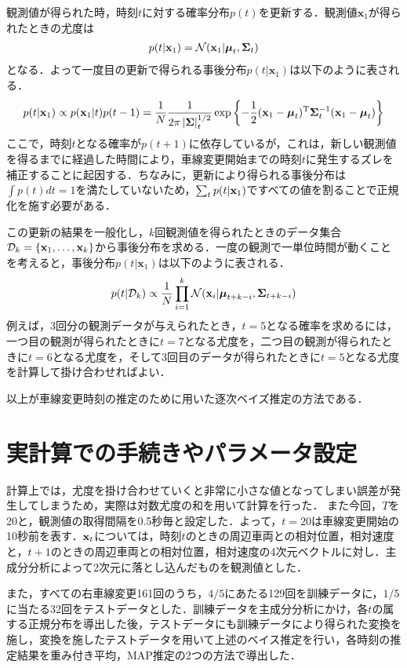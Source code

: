 観測値が得られた時，時刻$t$に対する確率分布$p(t)$を更新する．観測値$\mathbf{x}_1$が得られたときの尤度は
\begin{align}
	p(t|\mathbf{x}_1)=\mathcal{N}(\mathbf{x}_1|\boldsymbol{\mu}_t,\mathbf{\Sigma}_t)
\end{align}
となる．よって一度目の更新で得られる事後分布$p(t|\mathbf{x}_1)$は以下のように表される．
\begin{align}
	p(t|\mathbf{x}_1)\propto p(\mathbf{x}_1|t)p(t-1)=\frac{1}{N}\frac{1}{2\pi\left|\mathbf{\Sigma}\right|_t^{1/2}}\exp\left\{-\frac{1}{2}(\mathbf{x}_1-\boldsymbol{\mu}_t)^\mathrm{T}\mathbf{\Sigma}_t^{-1}(\mathbf{x}_1-\boldsymbol{\mu}_t)\right\}
\end{align}
ここで，時刻$t$となる確率が$p(t+1)$に依存しているが，これは，新しい観測値を得るまでに経過した時間により，車線変更開始までの時刻$t$に発生するズレを補正することに起因する．ちなみに，更新により得られる事後分布は$\int p(t)dt=1$を満たしていないため，$\sum_t p(t|\mathbf{x}_1)$ですべての値を割ることで正規化を施す必要がある．
\par
この更新の結果を一般化し，$k$回観測値を得られたときのデータ集合$\mathcal{D}_k=\{\mathbf{x}_1,\ldots,\mathbf{x}_k\}$から事後分布を求める．一度の観測で一単位時間が動くことを考えると，事後分布$p(t|\mathbf{x}_1)$は以下のように表される．
\begin{align}
	p(t|\mathcal{D}_k)\propto\frac{1}{N}\prod_{i=1}^k \mathcal{N}(\mathbf{x}_i|\boldsymbol{\mu}_{t+k-i}, \mathbf{\Sigma}_{t+k-i})
\end{align}
例えば，3回分の観測データが与えられたとき，$t=5$となる確率を求めるには，一つ目の観測が得られたときに$t=7$となる尤度を，二つ目の観測が得られたときに$t=6$となる尤度を，そして3回目のデータが得られたときに$t=5$となる尤度を計算して掛け合わせればよい．
\par
以上が車線変更時刻の推定のために用いた逐次ベイズ推定の方法である．
\section{実計算での手続きやパラメータ設定}
計算上では，尤度を掛け合わせていくと非常に小さな値となってしまい誤差が発生してしまうため，実際は対数尤度の和を用いて計算を行った．%
また今回，$T$を20と，観測値の取得間隔を0.5秒毎と設定した．よって，$t=20$は車線変更開始の10秒前を表す．$\mathbf{x}_t$については，時刻$t$のときの周辺車両との相対位置，相対速度と，$t+1$のときの周辺車両との相対位置，相対速度の4次元ベクトルに対し．主成分分析によって2次元に落とし込んだものを観測値とした．
\par
また，すべての右車線変更161回のうち，$4/5$にあたる129回を訓練データに，$1/5$に当たる32回をテストデータとした．訓練データを主成分分析にかけ，各$t$の属する正規分布を導出した後，テストデータにも訓練データにより得られた変換を施し，変換を施したテストデータを用いて上述のベイス推定を行い，各時刻の推定結果を重み付き平均，MAP推定の2つの方法で導出した．
